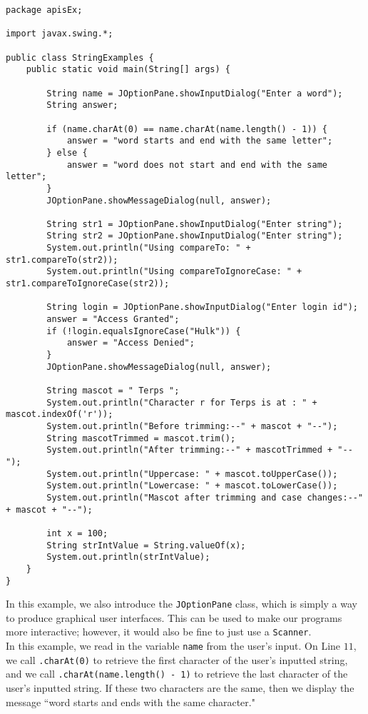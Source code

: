 \begin{lstlisting}
package apisEx;

import javax.swing.*;

public class StringExamples {
	public static void main(String[] args) {

		String name = JOptionPane.showInputDialog("Enter a word");
		String answer;

		if (name.charAt(0) == name.charAt(name.length() - 1)) {
			answer = "word starts and end with the same letter";
		} else {
			answer = "word does not start and end with the same letter";
		}
		JOptionPane.showMessageDialog(null, answer);

		String str1 = JOptionPane.showInputDialog("Enter string");
		String str2 = JOptionPane.showInputDialog("Enter string");
		System.out.println("Using compareTo: " + str1.compareTo(str2));
		System.out.println("Using compareToIgnoreCase: " + str1.compareToIgnoreCase(str2));

		String login = JOptionPane.showInputDialog("Enter login id");
		answer = "Access Granted";
		if (!login.equalsIgnoreCase("Hulk")) {
			answer = "Access Denied";
		}
		JOptionPane.showMessageDialog(null, answer);

		String mascot = " Terps ";
		System.out.println("Character r for Terps is at : " + mascot.indexOf('r'));
		System.out.println("Before trimming:--" + mascot + "--");
		String mascotTrimmed = mascot.trim();
		System.out.println("After trimming:--" + mascotTrimmed + "--");
		System.out.println("Uppercase: " + mascot.toUpperCase());
		System.out.println("Lowercase: " + mascot.toLowerCase());
		System.out.println("Mascot after trimming and case changes:--" + mascot + "--");

		int x = 100;
		String strIntValue = String.valueOf(x);
		System.out.println(strIntValue);
	}
}
\end{lstlisting}

In this example, we also introduce the \verb!JOptionPane! class, which is simply a way to produce graphical user interfaces. This can be used to make our programs more interactive; however, it would also be fine to just use a \verb!Scanner!. \\


In this example, we read in the variable \verb!name! from the user's input. On Line $11$, we call \verb!.charAt(0)! to retrieve the first character of the user's inputted string, and we call \verb!.charAt(name.length() - 1)! to retrieve the last character of the user's inputted string. If these two characters are the same, then we display the message ``word starts and ends with the same character." \\

